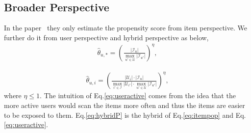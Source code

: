 \documentclass[sigconf]{acmart}
\begin{document}


	\subsection{Broader Perspective}
In the paper~\cite{saito2020unbiased} they only estimate the propensity score from item perspective. We further do it from user perspective and hybrid perspective as below,
\begin{eqnarray}\label{eq:useractive}
\hat{\theta}_{u,*} = \left(\frac{|\mathcal{I}_u|}{\max_{u' \in \mathcal{U}} |\mathcal{I}_{u'}|}\right)^{\eta} ,
\end{eqnarray}

\begin{eqnarray}\label{eq:hybridP}
\hat{\theta}_{u,i} = \left(\frac{|\mathcal{U}_i| \cdot |\mathcal{I}_u|} {\max_{i' \in \mathcal{I}} |\mathcal{U}_{i'}| \cdot \max_{u' \in \mathcal{U}} |\mathcal{I}_{u'}|}\right)^{\eta} ,
\end{eqnarray}
where $\eta \leq 1$. The intuition of Eq.\eqref{eq:useractive} comes from the idea that the more active users would scan the items more often and thus the items are easier to be exposed to them. Eq.\eqref{eq:hybridP} is the hybrid of Eq.\eqref{eq:itempop} and Eq.\eqref{eq:useractive}.

%		
%			
%				
%				
%				
%			
%		
%	
\end{document}
